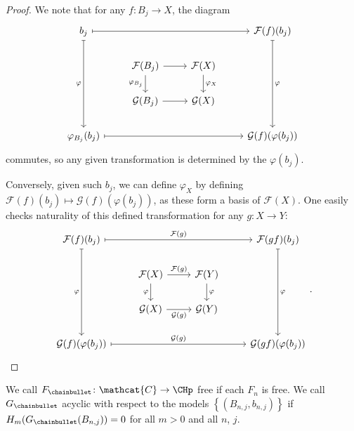 \begin{proof}
  We note that for any $f\colon B_j \to X$, the diagram
  \[
    \begin{tikzcd}
      b_j
      \ar[mapsto]{rrr}
      \ar[mapsto, swap]{ddd}{\varphi }
      &
      &
      &
      \mathcal{F}(f)(b_j)
      \ar[mapsto]{ddd}{\varphi }
      \\
      &
      \mathcal{F}(B_j)
      \ar[swap]{d}{\varphi_{B_j}}
      \ar{r}{}
      &
      \mathcal{F}(X)
      \ar{d}{\varphi _{X}}
      \\
      &
      \mathcal{G}(B_j)
      \ar[swap]{r}{}
      &
      \mathcal{G}(X)
      \\
      \varphi _{B_j}(b_j)
      \ar[mapsto]{rrr}
      &
      &
      &
      \mathcal{G}(f)(\varphi (b_j))
    \end{tikzcd}
  \]
  commutes, so any given transformation is determined by the $\varphi (b_j)$.

  Conversely, given such $b_j$, we can define $\varphi _X$ by defining
  $\mathcal{F}(f)(b_j) \mapsto \mathcal{G}(f)(\varphi (b_j))$,
  as these form a basis of $\mathcal{F}(X)$.
  One easily checks naturality of this defined transformation
  for any $g\colon  X \to  Y$:
  \[
    \begin{tikzcd}
      \mathcal{F}(f)(b_j)
      \ar[mapsto, swap]{ddd}{\varphi }
      \ar[mapsto]{rrr}{\mathcal{F}(g)}
      &
      &
      &
      \mathcal{F}(gf)(b_j)
      \ar[mapsto]{ddd}{\varphi }
      \\
      &
      \mathcal{F}(X)
      \ar{r}{\mathcal{F}(g)}
      \ar[swap]{d}{\varphi }
      &
      \mathcal{F}(Y)
      \ar{d}{\varphi }
      \\
      &
      \mathcal{G}(X)
      \ar[swap]{r}{\mathcal{G}(g)}
      &
      \mathcal{G}(Y)
      \\
      \mathcal{G}(f)(\varphi (b_j))
      \ar[mapsto]{rrr}{\mathcal{G}(g)}
      &
      &
      &
      \mathcal{G}(gf)(\varphi (b_j))
    \end{tikzcd}
  .\] 
\end{proof}

\begin{definition}
  We call $F_{\chainbullet} \colon  \mathcat{C} \to  \CHp$ free if each $F_n$ is free.
  We call  $G_{\chainbullet}$ acyclic with respect to the models
   $\left\{(B_{n,j}, b_{n,j})\right\} $ 
   if $H_m(G_{\chainbullet}(B_{n,j})) = 0$ for all $m>0$ and all $n$,  $j$.
\end{definition}

